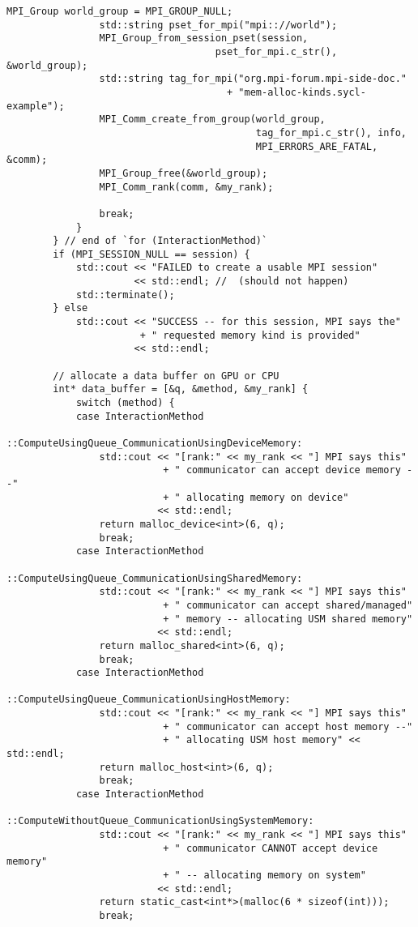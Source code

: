 \begin{example}
\begin{lstlisting}[language={[MPI]C++}]
                MPI_Group world_group = MPI_GROUP_NULL;
                std::string pset_for_mpi("mpi:://world");
                MPI_Group_from_session_pset(session,
                                    pset_for_mpi.c_str(), &world_group);
                std::string tag_for_mpi("org.mpi-forum.mpi-side-doc."
                                      + "mem-alloc-kinds.sycl-example");
                MPI_Comm_create_from_group(world_group,
                                           tag_for_mpi.c_str(), info,
                                           MPI_ERRORS_ARE_FATAL, &comm);
                MPI_Group_free(&world_group);
                MPI_Comm_rank(comm, &my_rank);

                break;
            }
        } // end of `for (InteractionMethod)`
        if (MPI_SESSION_NULL == session) {
            std::cout << "FAILED to create a usable MPI session"
                      << std::endl; //  (should not happen)
            std::terminate();
        } else
            std::cout << "SUCCESS -- for this session, MPI says the"
                       + " requested memory kind is provided"
                      << std::endl;

        // allocate a data buffer on GPU or CPU
        int* data_buffer = [&q, &method, &my_rank] {
            switch (method) {
            case InteractionMethod
                     ::ComputeUsingQueue_CommunicationUsingDeviceMemory:
                std::cout << "[rank:" << my_rank << "] MPI says this"
                           + " communicator can accept device memory --"
                           + " allocating memory on device"
                          << std::endl;
                return malloc_device<int>(6, q);
                break;
            case InteractionMethod
                     ::ComputeUsingQueue_CommunicationUsingSharedMemory:
                std::cout << "[rank:" << my_rank << "] MPI says this"
                           + " communicator can accept shared/managed"
                           + " memory -- allocating USM shared memory"
                          << std::endl;
                return malloc_shared<int>(6, q);
                break;
            case InteractionMethod
                       ::ComputeUsingQueue_CommunicationUsingHostMemory:
                std::cout << "[rank:" << my_rank << "] MPI says this"
                           + " communicator can accept host memory --"
                           + " allocating USM host memory" << std::endl;
                return malloc_host<int>(6, q);
                break;
            case InteractionMethod
                   ::ComputeWithoutQueue_CommunicationUsingSystemMemory:
                std::cout << "[rank:" << my_rank << "] MPI says this"
                           + " communicator CANNOT accept device memory"
                           + " -- allocating memory on system"
                          << std::endl;
                return static_cast<int*>(malloc(6 * sizeof(int)));
                break;


\end{lstlisting}
\end{example}
